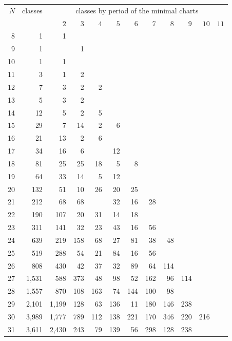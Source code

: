 \documentclass[11pt,a4paper]{amsart}
\numberwithin{equation}{section}
\theoremstyle{plain}
\theoremstyle{definition}
\begin{document}
\begin{table}[ht]
\centering
\footnotesize
\begin{tabular}{rrrrrrrrrrrr}
\toprule
\(N\) & classes & \multicolumn{10}{c}{classes by period of the minimal charts} \\
 & & \(2\) & \(3\) & \(4\) & \(5\) & \(6\) & \(7\) & \(8\) & \(9\) & \(10\) & \(11\)\\
\midrule
8 & 1 & 1 &  &  &  &  &  &  &  &  &  \\
9 & 1 &  & 1 &  &  &  &  &  &  &  &  \\
10 & 1 & 1 &  &  &  &  &  &  &  &  &  \\
11 & 3 & 1 & 2 &  &  &  &  &  &  &  &  \\
12 & 7 & 3 & 2 & 2 &  &  &  &  &  &  &  \\
13 & 5 & 3 & 2 &  &  &  &  &  &  &  &  \\
14 & 12 & 5 & 2 & 5 &  &  &  &  &  &  &  \\
15 & 29 & 7 & 14 & 2 & 6 &  &  &  &  &  &  \\
16 & 21 & 13 & 2 & 6 &  &  &  &  &  &  &  \\
17 & 34 & 16 & 6 &  & 12 &  &  &  &  &  &  \\
18 & 81 & 25 & 25 & 18 & 5 & 8 &  &  &  &  &  \\
19 & 64 & 33 & 14 & 5 & 12 &  &  &  &  &  &  \\
20 & 132 & 51 & 10 & 26 & 20 & 25 &  &  &  &  &  \\
21 & 212 & 68 & 68 &  & 32 & 16 & 28 &  &  &  &  \\
22 & 190 & 107 & 20 & 31 & 14 & 18 &  &  &  &  &  \\
23 & 311 & 141 & 32 & 23 & 43 & 16 & 56 &  &  &  &  \\
24 & 639 & 219 & 158 & 68 & 27 & 81 & 38 & 48 &  &  &  \\
25 & 519 & 288 & 54 & 21 & 84 & 16 & 56 &  &  &  &  \\
26 & 808 & 430 & 42 & 37 & 32 & 89 & 64 & 114 &  &  &  \\
27 & 1{,}531 & 588 & 373 & 48 & 98 & 52 & 162 & 96 & 114 &  &  \\
28 & 1{,}557 & 870 & 108 & 163 & 74 & 144 & 100 & 98 &  &  &  \\
29 & 2{,}101 & 1{,}199 & 128 & 63 & 136 & 11 & 180 & 146 & 238 &  &  \\
30 & 3{,}989 & 1{,}777 & 789 & 112 & 138 & 221 & 170 & 346 & 220 & 216 &  \\
31 & 3{,}611 & 2{,}430 & 243 & 79 & 139 & 56 & 298 & 128 & 238 &  &  \\

\end{tabular}
\end{table}
\end{document}
